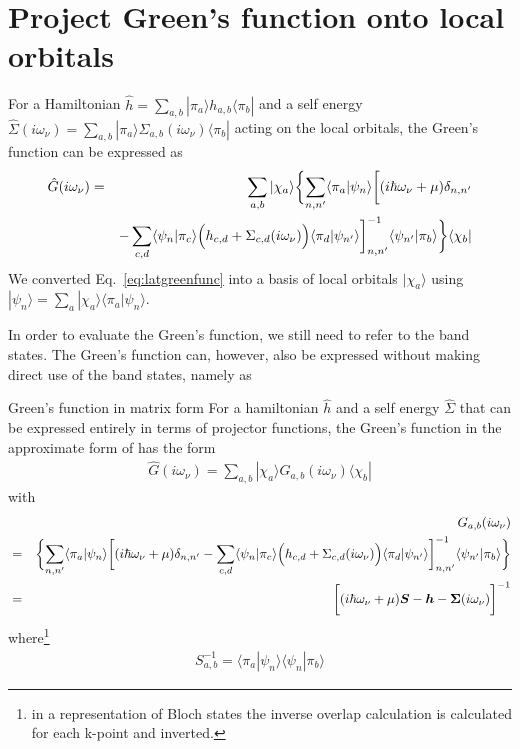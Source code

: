 \documentclass[11pt,a4paper]{report}
\begin{document}
\section{Project Green's function onto local orbitals}
For a Hamiltonian $\hat{h}=\sum_{a,b}|\pi_a\rangle
h_{a,b}\langle\pi_b|$ and a self energy 
$\hat{\Sigma}(i\omega_\nu)=
\sum_{a,b}|\pi_a\rangle
\Sigma_{a,b}(i\omega_\nu)
\langle\pi_b|$
acting on the local orbitals, the Green's function can be expressed
as
\begin{eqnarray}
\hat{G}(i\omega_\nu)&=&
\sum_{a,b}|\chi_a\rangle
\biggl\lbrace
\sum_{n,n'}\langle\pi_a|\psi_n\rangle
\biggl[
(i\hbar\omega_\nu+\mu)\delta_{n,n'}
\nonumber\\
&&-\sum_{c,d}\langle\psi_n|\pi_c\rangle
\Bigl(h_{c,d}+\Sigma_{c,d}(i\omega_\nu)\Bigr)
\langle\pi_d|\psi_{n'}\rangle
\biggr]^{-1}_{n,n'}
\langle\psi_{n'}|\pi_b\rangle
\biggr\rbrace
\langle\chi_b|
\label{eq:greenlocorb}
\end{eqnarray}
We converted Eq.~\eqref{eq:latgreenfunc} into a basis of local
orbitals $|\chi_a\rangle$ using
$|\psi_n\rangle=\sum_a|\chi_a\rangle\langle\pi_a|\psi_n\rangle$.


In order to evaluate the Green's function, we still need to refer to the
band states. The Green's function can, however, also be expressed
without making direct use of the band states, namely as
\begin{myshadowminipage}{Green's function in matrix form}
For a hamiltonian $\hat{h}$ and a self energy $\hat{\Sigma}$ that can
be expressed entirely in terms of projector functions, the Green's
function in the approximate form of  has the form
\begin{eqnarray}
\hat{G}(i\omega_\nu)=\sum_{a,b}|\chi_a\rangle
G_{a,b}(i\omega_\nu)\langle\chi_b|
\end{eqnarray}
with
\begin{eqnarray}
&&G_{a,b}(i\omega_\nu)
\nonumber\\
&=&
\biggl\lbrace
\sum_{n,n'}\langle\pi_a|\psi_n\rangle
\biggl[
(i\hbar\omega_\nu+\mu)\delta_{n,n'}
-\sum_{c,d}\langle\psi_n|\pi_c\rangle
\Bigl(h_{c,d}+\Sigma_{c,d}(i\omega_\nu)\Bigr)
\langle\pi_d|\psi_{n'}\rangle
\biggr]^{-1}_{n,n'}
\langle\psi_{n'}|\pi_b\rangle
\biggr\rbrace
\nonumber\\
&=&\biggl[(i\hbar\omega_\nu+\mu)\bm{S}
-\bm{h}-\bm{\Sigma}(i\omega_\nu)\biggr]^{-1}
\label{eq:greenlocform1}
\end{eqnarray}
where\footnote{in a representation of Bloch states the inverse overlap
  calculation is calculated for each k-point and inverted.}
\begin{eqnarray}
S^{-1}_{a,b}=\langle\pi_a|\psi_n\rangle \langle\psi_n|\pi_b\rangle
\label{eq:inverses}
\end{eqnarray}
\end{myshadowminipage}
\end{document}
